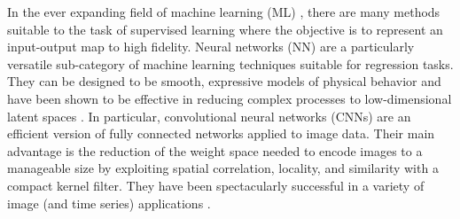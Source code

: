 \documentclass[12pt,reqno]{article}
\begin{document}
In the ever expanding field of machine learning (ML) \cite{bishop2006pattern,hastie2005elements,goodfellow2016deep}, there are many methods suitable to the task of supervised learning where the objective is to represent an input-output map to high fidelity.
Neural networks (NN) \cite{hopfield1982neural,Goodfellow-et-al-2016} are a particularly versatile sub-category of machine learning techniques suitable for regression tasks.
They can be designed to be smooth, expressive models of physical behavior and have been shown to be effective in reducing complex processes to low-dimensional latent spaces \cite{lee2019deep,fulton2019latent}.
In particular, convolutional neural networks (CNNs) \cite{lecun1989backpropagation,o2015introduction,albawi2017understanding,qin2018convolutional} are an efficient version of fully connected networks applied to image data.
Their main advantage is the reduction of the weight space needed to encode images to a manageable size by exploiting spatial correlation, locality, and similarity with a compact kernel filter.
They have been spectacularly successful in a variety of image (and time series) applications \cite{lecun1998gradient,krizhevsky2012imagenet,liu2017survey}.
\end{document}
